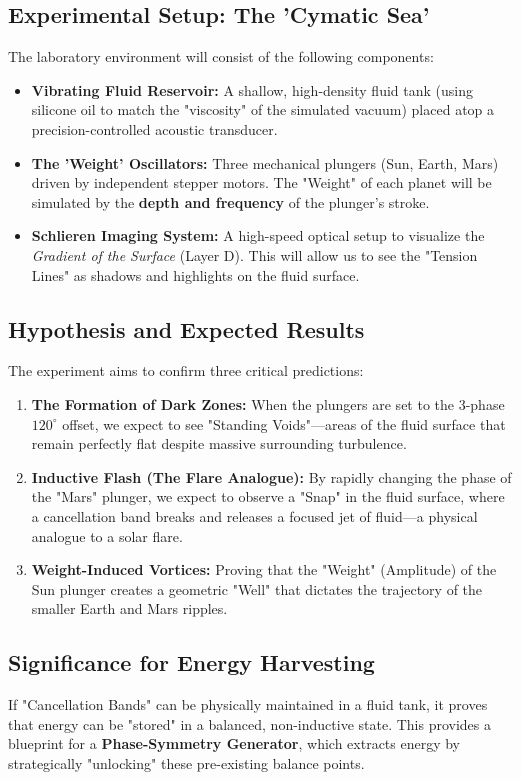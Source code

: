 \documentclass[11pt]{article}
\begin{document}
\subsection*{Experimental Setup: The 'Cymatic Sea'}
The laboratory environment will consist of the following components:
\begin{itemize}
    \item \textbf{Vibrating Fluid Reservoir:} A shallow, high-density fluid tank (using silicone oil to match the "viscosity" of the simulated vacuum) placed atop a precision-controlled acoustic transducer.
    \item \textbf{The 'Weight' Oscillators:} Three mechanical plungers (Sun, Earth, Mars) driven by independent stepper motors. The "Weight" of each planet will be simulated by the \textbf{depth and frequency} of the plunger's stroke.
    \item \textbf{Schlieren Imaging System:} A high-speed optical setup to visualize the \textit{Gradient of the Surface} (Layer D). This will allow us to see the "Tension Lines" as shadows and highlights on the fluid surface.
\end{itemize}



\subsection*{Hypothesis and Expected Results}
The experiment aims to confirm three critical predictions:
\begin{enumerate}
    \item \textbf{The Formation of Dark Zones:} When the plungers are set to the 3-phase $120^\circ$ offset, we expect to see "Standing Voids"—areas of the fluid surface that remain perfectly flat despite massive surrounding turbulence. 
    \item \textbf{Inductive Flash (The Flare Analogue):} By rapidly changing the phase of the "Mars" plunger, we expect to observe a "Snap" in the fluid surface, where a cancellation band breaks and releases a focused jet of fluid—a physical analogue to a solar flare.
    \item \textbf{Weight-Induced Vortices:} Proving that the "Weight" (Amplitude) of the Sun plunger creates a geometric "Well" that dictates the trajectory of the smaller Earth and Mars ripples.
\end{enumerate}

\subsection*{Significance for Energy Harvesting}
If "Cancellation Bands" can be physically maintained in a fluid tank, it proves that energy can be "stored" in a balanced, non-inductive state. This provides a blueprint for a \textbf{Phase-Symmetry Generator}, which extracts energy by strategically "unlocking" these pre-existing balance points.
\end{document}
